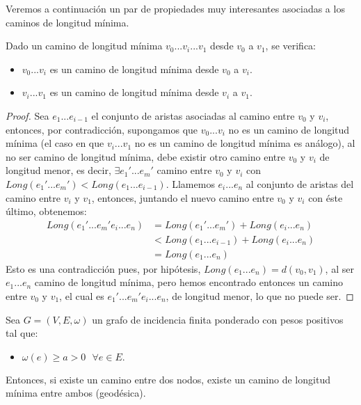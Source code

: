 Veremos a continuación un par de propiedades muy interesantes asociadas a los caminos de longitud mínima.

\begin{proposicion}\label{prop:separa_cam_min_long}
	Dado un camino de longitud mínima $v_0...v_i...v_1$ desde $v_0$ a $v_1$, se verifica:
	\begin{itemize}
		\item $v_0...v_i$ es un camino de longitud mínima desde $v_0$ a $v_i$.
		\item $v_i...v_1$ es un camino de longitud mínima desde $v_i$ a $v_1$.
	\end{itemize}
\end{proposicion}

\begin{proof}
	Sea $e_1...e_{i-1}$ el conjunto de aristas asociadas al camino entre $v_0$ y $v_i$, entonces, por contradicción, supongamos que $v_0...v_i$ no es un camino de longitud mínima (el caso en que $v_i...v_1$ no es un camino de longitud mínima es análogo), al no ser camino de longitud mínima, debe existir otro camino entre $v_0$ y $v_i$ de longitud menor, es decir, $\exists e_1'...e_m'$ camino entre $v_0$ y $v_i$ con $Long(e_1'...e_m') < Long(e_1...e_{i-1})$. Llamemos $e_i...e_n$ al conjunto de aristas del camino entre $v_i$ y $v_1$, entonces, juntando el nuevo camino entre $v_0$ y $v_i$ con éste último, obtenemos:
	\begin{equation}
		\begin{split}
			Long(e_1'...e_m'e_i...e_n) & =Long(e_1'...e_m') + Long(e_i...e_n) \\
			& < Long(e_1...e_{i-1}) + Long(e_i...e_n) \\
			& =	Long(e_1...e_n)
		\end{split}
	\end{equation}
	Esto es una contradicción pues, por hipótesis, $Long(e_1...e_n) = d(v_0,v_1)$, al ser $e_1...e_n$ camino de longitud mínima, pero hemos encontrado entonces un camino entre $v_0$ y $v_1$, el cual es $e_1'...e_m'e_i...e_n$, de longitud menor, lo que no puede ser.
\end{proof}

\begin{proposicion}
	Sea $G=(V,E,\omega)$ un grafo de incidencia finita ponderado con pesos positivos tal que:
	\begin{itemize}
		\item $\omega (e)\geq a>0\ \ \ \forall e\in E.$
	\end{itemize}
	Entonces, si existe un camino entre dos nodos, existe un camino de longitud mínima entre ambos (geodésica).
\end{proposicion}

